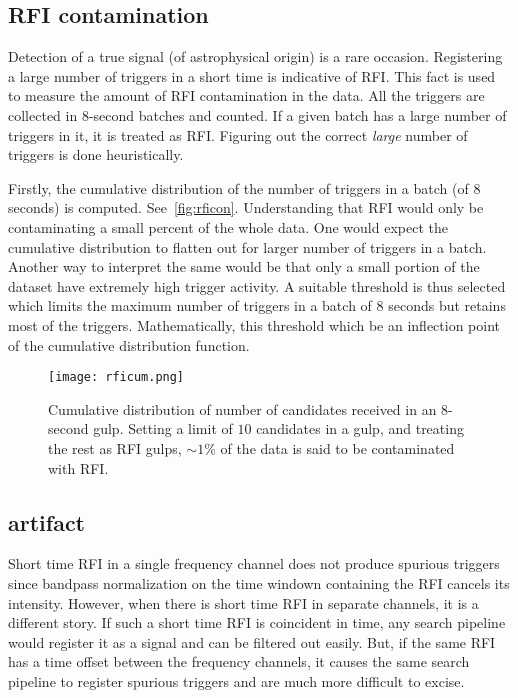 \subsection {RFI contamination}
\label{ssub:rfim}

\par Detection of a true signal (of astrophysical origin) is a rare occasion. Registering a large number of triggers in a short time is indicative of RFI.
This fact is used to measure the amount of RFI contamination in the \vfpfs data.
All the triggers are collected in $8$-second batches and counted.
If a given batch has a large number of triggers in it, it is treated as RFI.
Figuring out the correct \emph{large} number of triggers is done heuristically.

\par Firstly, the cumulative distribution of the number of triggers in a batch (of $8$ seconds) is computed. See~\autoref{fig:rficon}.
Understanding that RFI would only be contaminating a small percent of the whole data. 
One would expect the cumulative distribution to flatten out for larger number of triggers in a batch.
Another way to interpret the same would be that only a small portion of the dataset have extremely high trigger activity.
A suitable threshold is thus selected which limits the maximum number of triggers in a batch of $8$ seconds but retains most of the triggers.
Mathematically, this threshold which be an inflection point of the cumulative distribution function.

\begin{figure}
	\label{fig:rficon}
	\texttt{[image: rficum.png]}
	\caption{Cumulative distribution of number of candidates received in an $8$-second gulp.
		Setting a limit of $10$ candidates in a gulp, and treating the rest as RFI gulps, $\sim1\%$ of the \vfpfs data is said to be contaminated with RFI.
	}
\end{figure}

\subsection { artifact}
\label{ssub:dm150}

\par Short time RFI in a single frequency channel does not produce spurious triggers since bandpass normalization on the time windown containing the RFI cancels its intensity. 
However, when there is short time RFI in separate channels, it is a different story. 
If such a short time RFI is coincident in time, any search pipeline would register it as a  signal and can be filtered out easily.
But, if the same RFI has a time offset between the frequency channels, it causes the same search pipeline to register spurious triggers and are much more difficult to excise.

